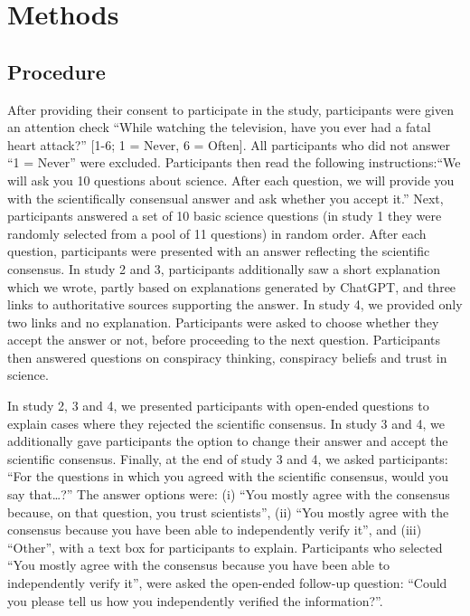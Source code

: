 \documentclass[
  doc,floatsintext]{apa6}
\begin{document}
\section{Methods}\label{methods}

\subsection{Procedure}\label{procedure}

After providing their consent to participate in the study, participants were given an attention check ``While watching the television, have you ever had a fatal heart attack?'' {[}1-6; 1 = Never, 6 = Often{]}. All participants who did not answer ``1 = Never'' were excluded. Participants then read the following instructions:``We will ask you 10 questions about science. After each question, we will provide you with the scientifically consensual answer and ask whether you accept it.'' Next, participants answered a set of 10 basic science questions (in study 1 they were randomly selected from a pool of 11 questions) in random order. After each question, participants were presented with an answer reflecting the scientific consensus. In study 2 and 3, participants additionally saw a short explanation which we wrote, partly based on explanations generated by ChatGPT, and three links to authoritative sources supporting the answer. In study 4, we provided only two links and no explanation. Participants were asked to choose whether they accept the answer or not, before proceeding to the next question. Participants then answered questions on conspiracy thinking, conspiracy beliefs and trust in science.

In study 2, 3 and 4, we presented participants with open-ended questions to explain cases where they rejected the scientific consensus. In study 3 and 4, we additionally gave participants the option to change their answer and accept the scientific consensus. Finally, at the end of study 3 and 4, we asked participants: ``For the questions in which you agreed with the scientific consensus, would you say that\ldots?'' The answer options were: (i) ``You mostly agree with the consensus because, on that question, you trust scientists'', (ii) ``You mostly agree with the consensus because you have been able to independently verify it'', and (iii) ``Other'', with a text box for participants to explain. Participants who selected ``You mostly agree with the consensus because you have been able to independently verify it'', were asked the open-ended follow-up question: ``Could you please tell us how you independently verified the information?''.
\end{document}
